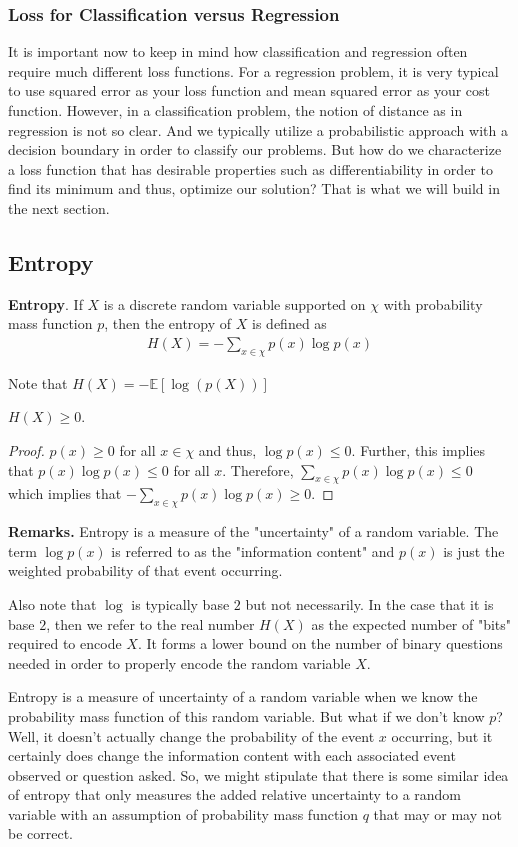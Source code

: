 \documentclass[12pt]{article}
\theoremstyle{definition}
\numberwithin{equation}{section}
\newcommand{\E}{\ensuremath{\mathbb{E}}}
\begin{document}
\subsubsection{Loss for Classification versus Regression}
It is important now to keep in mind how classification and regression often require much different loss functions. For a regression problem, it is very typical to use squared error as your loss function and mean squared error as your cost function. However, in a classification problem, the notion of distance as in regression is not so clear. And we typically utilize a probabilistic approach with a decision boundary in order to classify our problems. But how do we characterize a loss function that has desirable properties such as differentiability in order to find its minimum and thus, optimize our solution? That is what we will build in the next section.

\subsection{Entropy}
\textbf{Entropy}. If $X$ is a discrete random variable supported on $\chi$ with probability mass function $p$, then the entropy of $X$ is defined as
\begin{gather*}
    H(X) = -\sum_{x\in\chi}p(x)\log p(x)
\end{gather*}

Note that $H(X) = -\E[\log(p(X))]$

\lemma $H(X)\geq 0$.
\begin{proof}
    $p(x)\geq 0$ for all $x\in\chi$ and thus, $\log p(x)\leq 0$. Further, this implies that $p(x)\log p(x)\leq 0$ for all $x$. Therefore, $\sum_{x\in\chi}p(x)\log p(x) \leq 0$ which implies that $-\sum_{x\in\chi}p(x)\log p(x)\geq 0$.
\end{proof}

\textbf{Remarks.} Entropy is a measure of the "uncertainty" of a random variable. The term $\log p(x)$ is referred to as the "information content" and $p(x)$ is just the weighted probability of that event occurring.

Also note that $\log$ is typically base $2$ but not necessarily. In the case that it is base $2$, then we refer to the real number $H(X)$ as the expected number of "bits" required to encode $X$. It forms a lower bound on the number of binary questions needed in order to properly encode the random variable $X$.

Entropy is a measure of uncertainty of a random variable when we know the probability mass function of this random variable. But what if we don't know $p$? Well, it doesn't actually change the probability of the event $x$ occurring, but it certainly does change the information content with each associated event observed or question asked. So, we might stipulate that there is some similar idea of entropy that only measures the added relative uncertainty to a random variable with an assumption of probability mass function $q$ that may or may not be correct.
\end{document}
